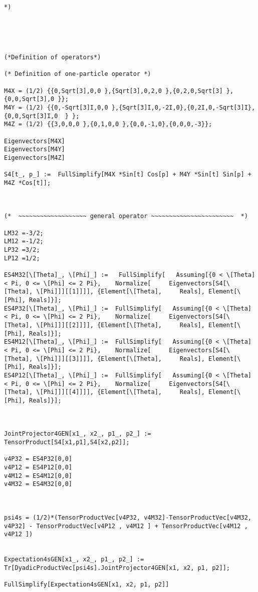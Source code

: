 \documentclass[%
  twocolumn,
 showpacs,
 showkeys,
 preprintnumbers,
 amsmath,amssymb,
 aps,
  pra,
  longbibliography,
 floatfix,
 ]{revtex4-1}
\begin{document}
{\begin{lstlisting}[backgroundcolor=\color{yellow!10},framerule=0pt,breaklines=true, frame=tb]
*)





(*Definition of operators*)

(* Definition of one-particle operator *)

M4X = (1/2) {{0,Sqrt[3],0,0 },{Sqrt[3],0,2,0 },{0,2,0,Sqrt[3] },{0,0,Sqrt[3],0 }};
M4Y = (1/2) {{0,-Sqrt[3]I,0,0 },{Sqrt[3]I,0,-2I,0},{0,2I,0,-Sqrt[3]I},{0,0,Sqrt[3]I,0  } };
M4Z = (1/2) {{3,0,0,0 },{0,1,0,0 },{0,0,-1,0},{0,0,0,-3}};

Eigenvectors[M4X]
Eigenvectors[M4Y]
Eigenvectors[M4Z]

S4[t_, p_] :=  FullSimplify[M4X *Sin[t] Cos[p] + M4Y *Sin[t] Sin[p] + M4Z *Cos[t]];



(*  ~~~~~~~~~~~~~~~~~~~ general operator ~~~~~~~~~~~~~~~~~~~~~~~  *)

LM32 =-3/2;
LM12 =-1/2;
LP32 =3/2;
LP12 =1/2;

ES4M32[\[Theta]_, \[Phi]_] :=   FullSimplify[   Assuming[{0 < \[Theta] < Pi, 0 <= \[Phi] <= 2 Pi},    Normalize[     Eigenvectors[S4[\[Theta], \[Phi]]][[1]]]], {Element[\[Theta],     Reals], Element[\[Phi], Reals]}];
ES4P32[\[Theta]_, \[Phi]_] :=  FullSimplify[   Assuming[{0 < \[Theta] < Pi, 0 <= \[Phi] <= 2 Pi},    Normalize[     Eigenvectors[S4[\[Theta], \[Phi]]][[2]]]], {Element[\[Theta],     Reals], Element[\[Phi], Reals]}];
ES4M12[\[Theta]_, \[Phi]_] :=  FullSimplify[   Assuming[{0 < \[Theta] < Pi, 0 <= \[Phi] <= 2 Pi},    Normalize[     Eigenvectors[S4[\[Theta], \[Phi]]][[3]]]], {Element[\[Theta],     Reals], Element[\[Phi], Reals]}];
ES4P12[\[Theta]_, \[Phi]_] :=  FullSimplify[   Assuming[{0 < \[Theta] < Pi, 0 <= \[Phi] <= 2 Pi},    Normalize[     Eigenvectors[S4[\[Theta], \[Phi]]][[4]]]], {Element[\[Theta],     Reals], Element[\[Phi], Reals]}];



JointProjector4GEN[x1_, x2_, p1_, p2_] :=  TensorProduct[S4[x1,p1],S4[x2,p2]];

v4P32 = ES4P32[0,0]
v4P12 = ES4P12[0,0]
v4M12 = ES4M12[0,0]
v4M32 = ES4M32[0,0]



psi4s = (1/2)*(TensorProductVec[v4P32, v4M32]-TensorProductVec[v4M32, v4P32] - TensorProductVec[v4P12 , v4M12 ] + TensorProductVec[v4M12 , v4P12 ])


Expectation4sGEN[x1_, x2_, p1_, p2_] := Tr[DyadicProductVec[psi4s].JointProjector4GEN[x1, x2, p1, p2]];

FullSimplify[Expectation4sGEN[x1, x2, p1, p2]]



\end{lstlisting}}
\end{document}
